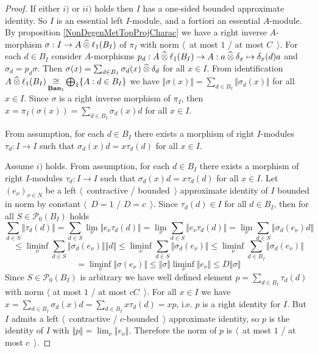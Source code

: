 \begin{proof} If either $i)$ or $ii)$ holds then $I$ has a one-sided bounded approximate identity. So $I$ is an essential left $I$-module, and a fortiori an essential $A$-module. By proposition \ref{NonDegenMetTopProjCharac} we have a right inverse $A$-morphism $\sigma:I\to A\mathbin{\widehat{\otimes}} \ell_1(B_I)$ of $\pi_I$ with norm  $\langle$~at most $1$ / at most $C$~$\rangle$. For each $d\in B_I$ consider $A$-morphisms $p_d:A\mathbin{\widehat{\otimes}} \ell_1(B_I)\to A:a\mathbin{\widehat{\otimes}} \delta_x\mapsto \delta_x(d)a$ and $\sigma_d=p_d\sigma$. Then $\sigma(x)=\sum_{d\in B_I}\sigma_d(x)\mathbin{\widehat{\otimes}} \delta_d$ for all $x\in I$. From identification $A\mathbin{\widehat{\otimes}}\ell_1(B_I)\mathop{\mathbin{\cong}}\limits_{\mathbf{Ban}_1}\bigoplus_1\{A:d\in B_I\}$ we have $\Vert\sigma(x)\Vert=\sum_{d\in B_I} \Vert\sigma_d(x)\Vert$ for all $x\in I$. Since $\sigma$ is a right inverse morphism of $\pi_I$, then $x=\pi_I(\sigma(x))=\sum_{d\in B_I}\sigma_d(x)d$ for all $x\in I$. 

From assumption, for each $d\in B_I$ there exists a morphism of right $I$-modules $\tau_d:I\to I$ such that $\sigma_d(x)d=x\tau_d(d)$ for all $x\in I$. 

Assume $i)$ holds. From assumption, for each $d\in B_I$ there exists a morphism of right $I$-modules $\tau_d:I\to I$ such that $\sigma_d(x)d=x\tau_d(d)$ for all $x\in I$.  Let $(e_\nu)_{\nu\in N}$ be a left $\langle$~contractive / bounded~$\rangle$ approximate identity of $I$ bounded in norm by constant $\langle$~$D=1$ / $D=c$~$\rangle$. Since $\tau_d(d)\in I$ for all $d\in B_I$, then for all $S\in\mathcal{P}_0(B_I)$ holds
$$
\sum_{d\in S}\Vert \tau_d(d)\Vert
=\sum_{d\in S}\lim_{\nu}\Vert e_\nu \tau_d(d) \Vert
=\lim_{\nu}\sum_{d\in S}\Vert e_\nu \tau_d(d)\Vert
=\lim_{\nu}\sum_{d\in S}\Vert \sigma_d(e_\nu)d \Vert
$$
$$
\leq\liminf_{\nu}\sum_{d\in S}\Vert\sigma_d(e_\nu)\Vert\Vert d\Vert 
\leq\liminf_{\nu}\sum_{d\in S}\Vert\sigma_d(e_\nu)\Vert
\leq\liminf_{\nu}\sum_{d\in B_I}\Vert\sigma_d(e_\nu)\Vert
$$
$$
=\liminf_{\nu}\Vert\sigma(e_\nu)\Vert
\leq\Vert\sigma\Vert\liminf_{\nu}\Vert e_\nu\Vert
\leq D\Vert\sigma\Vert 
$$
Since $S\in \mathcal{P}_0(B_I)$ is arbitrary we have well defined element $p=\sum_{d\in B_I}\tau_d(d)$ with norm $\langle$ at most $1$ / at most $cC$~$\rangle$. For all $x\in I$ we have $x=\sum_{d\in B_I}\sigma_d(x)d=\sum_{d\in B_I}x\tau_d(d)=xp$, i.e. $p$ is a right identity for $I$. But $I$ admits a left $\langle$~contractive / $c$-bounded~$\rangle$ approximate identity, so $p$ is the identity of $I$ with $\Vert p\Vert=\lim_\nu\Vert e_\nu\Vert$. Therefore the norm of $p$ is $\langle$~at most $1$ / at most $c$~$\rangle$.


\end{proof}
